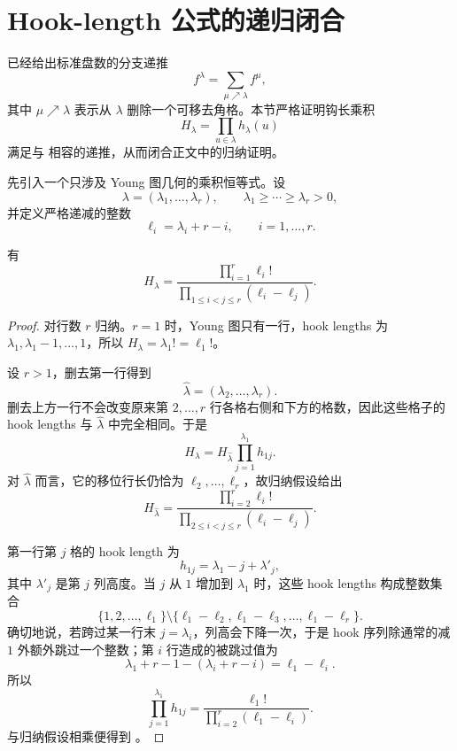 \section{Hook-length 公式的递归闭合}

已经给出标准盘数的分支递推
\begin{equation}
f^\lambda=\sum_{\mu\nearrow\lambda}f^\mu,
\label{eq:hook-recursion-app}
\end{equation}
其中 $\mu\nearrow\lambda$ 表示从 $\lambda$ 删除一个可移去角格。本节严格证明钩长乘积
\[
H_\lambda=\prod_{u\in\lambda}h_\lambda(u)
\]
满足与  相容的递推，从而闭合正文中的归纳证明。

先引入一个只涉及 Young 图几何的乘积恒等式。设
\[
\lambda=(\lambda_1,\dots,\lambda_r),
\qquad
\lambda_1\ge\cdots\ge\lambda_r>0,
\]
并定义严格递减的整数
\begin{equation}
\ell_i=\lambda_i+r-i,
\qquad i=1,\dots,r.
\label{eq:shifted-row-lengths}
\end{equation}

\begin{lemma}[钩长乘积的移位行长形式]
有
\begin{equation}
H_\lambda
=\frac{\displaystyle\prod_{i=1}^{r}\ell_i!}
{\displaystyle\prod_{1\le i<j\le r}(\ell_i-\ell_j)}.
\label{eq:hook-product-shifted}
\end{equation}

\end{lemma}

\begin{proof}
对行数 $r$ 归纳。$r=1$ 时，Young 图只有一行，hook lengths 为 $\lambda_1,\lambda_1-1,\dots,1$，所以 $H_\lambda=\lambda_1!=\ell_1!$。

设 $r>1$，删去第一行得到
\[
\widehat\lambda=(\lambda_2,\dots,\lambda_r).
\]
删去上方一行不会改变原来第 $2,\dots,r$ 行各格右侧和下方的格数，因此这些格子的 hook lengths 与 $\widehat\lambda$ 中完全相同。于是
\[
H_\lambda=H_{\widehat\lambda}\prod_{j=1}^{\lambda_1}h_{1j}.
\]
对 $\widehat\lambda$ 而言，它的移位行长仍恰为 $\ell_2,\dots,\ell_r$，故归纳假设给出
\[
H_{\widehat\lambda}
=\frac{\prod_{i=2}^{r}\ell_i!}
{\prod_{2\le i<j\le r}(\ell_i-\ell_j)}.
\]

第一行第 $j$ 格的 hook length 为
\[
h_{1j}=\lambda_1-j+\lambda'_j,
\]
其中 $\lambda'_j$ 是第 $j$ 列高度。当 $j$ 从 $1$ 增加到 $\lambda_1$ 时，这些 hook lengths 构成整数集合
\[
\{1,2,\dots,\ell_1\}
\setminus
\{\ell_1-\ell_2,\ell_1-\ell_3,\dots,\ell_1-\ell_r\}.
\]
确切地说，若跨过某一行末 $j=\lambda_i$，列高会下降一次，于是 hook 序列除通常的减 $1$ 外额外跳过一个整数；第 $i$ 行造成的被跳过值为
\[
\lambda_1+r-1-(\lambda_i+r-i)=\ell_1-\ell_i.
\]
所以
\[
\prod_{j=1}^{\lambda_1}h_{1j}
=\frac{\ell_1!}{\prod_{i=2}^{r}(\ell_1-\ell_i)}.
\]
与归纳假设相乘便得到 。
\end{proof}

